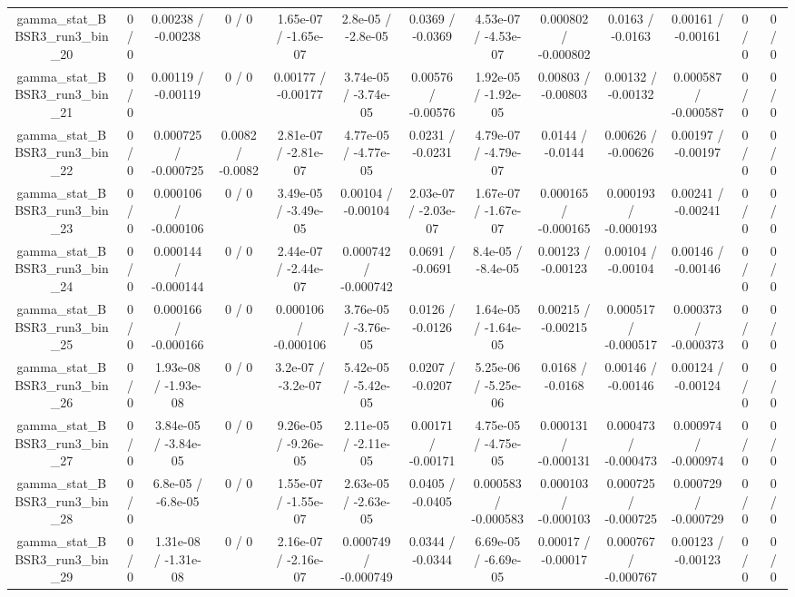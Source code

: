 \documentclass[10pt]{article}
\begin{document}
\begin{table}[htbp]
\begin{center}
\begin{tabular}{|c|c|c|c|c|c|c|c|c|c|c|c|c|}
  gamma_stat_BBSR3_run3_bin_20 & 0 / 0 & 0.00238 / -0.00238 & 0 / 0 & 1.65e-07 / -1.65e-07 & 2.8e-05 / -2.8e-05 & 0.0369 / -0.0369 & 4.53e-07 / -4.53e-07 & 0.000802 / -0.000802 & 0.0163 / -0.0163 & 0.00161 / -0.00161 & 0 / 0 & 0 / 0 \\ 
  gamma_stat_BBSR3_run3_bin_21 & 0 / 0 & 0.00119 / -0.00119 & 0 / 0 & 0.00177 / -0.00177 & 3.74e-05 / -3.74e-05 & 0.00576 / -0.00576 & 1.92e-05 / -1.92e-05 & 0.00803 / -0.00803 & 0.00132 / -0.00132 & 0.000587 / -0.000587 & 0 / 0 & 0 / 0 \\ 
  gamma_stat_BBSR3_run3_bin_22 & 0 / 0 & 0.000725 / -0.000725 & 0.0082 / -0.0082 & 2.81e-07 / -2.81e-07 & 4.77e-05 / -4.77e-05 & 0.0231 / -0.0231 & 4.79e-07 / -4.79e-07 & 0.0144 / -0.0144 & 0.00626 / -0.00626 & 0.00197 / -0.00197 & 0 / 0 & 0 / 0 \\ 
  gamma_stat_BBSR3_run3_bin_23 & 0 / 0 & 0.000106 / -0.000106 & 0 / 0 & 3.49e-05 / -3.49e-05 & 0.00104 / -0.00104 & 2.03e-07 / -2.03e-07 & 1.67e-07 / -1.67e-07 & 0.000165 / -0.000165 & 0.000193 / -0.000193 & 0.00241 / -0.00241 & 0 / 0 & 0 / 0 \\ 
  gamma_stat_BBSR3_run3_bin_24 & 0 / 0 & 0.000144 / -0.000144 & 0 / 0 & 2.44e-07 / -2.44e-07 & 0.000742 / -0.000742 & 0.0691 / -0.0691 & 8.4e-05 / -8.4e-05 & 0.00123 / -0.00123 & 0.00104 / -0.00104 & 0.00146 / -0.00146 & 0 / 0 & 0 / 0 \\ 
  gamma_stat_BBSR3_run3_bin_25 & 0 / 0 & 0.000166 / -0.000166 & 0 / 0 & 0.000106 / -0.000106 & 3.76e-05 / -3.76e-05 & 0.0126 / -0.0126 & 1.64e-05 / -1.64e-05 & 0.00215 / -0.00215 & 0.000517 / -0.000517 & 0.000373 / -0.000373 & 0 / 0 & 0 / 0 \\ 
  gamma_stat_BBSR3_run3_bin_26 & 0 / 0 & 1.93e-08 / -1.93e-08 & 0 / 0 & 3.2e-07 / -3.2e-07 & 5.42e-05 / -5.42e-05 & 0.0207 / -0.0207 & 5.25e-06 / -5.25e-06 & 0.0168 / -0.0168 & 0.00146 / -0.00146 & 0.00124 / -0.00124 & 0 / 0 & 0 / 0 \\ 
  gamma_stat_BBSR3_run3_bin_27 & 0 / 0 & 3.84e-05 / -3.84e-05 & 0 / 0 & 9.26e-05 / -9.26e-05 & 2.11e-05 / -2.11e-05 & 0.00171 / -0.00171 & 4.75e-05 / -4.75e-05 & 0.000131 / -0.000131 & 0.000473 / -0.000473 & 0.000974 / -0.000974 & 0 / 0 & 0 / 0 \\ 
  gamma_stat_BBSR3_run3_bin_28 & 0 / 0 & 6.8e-05 / -6.8e-05 & 0 / 0 & 1.55e-07 / -1.55e-07 & 2.63e-05 / -2.63e-05 & 0.0405 / -0.0405 & 0.000583 / -0.000583 & 0.000103 / -0.000103 & 0.000725 / -0.000725 & 0.000729 / -0.000729 & 0 / 0 & 0 / 0 \\ 
  gamma_stat_BBSR3_run3_bin_29 & 0 / 0 & 1.31e-08 / -1.31e-08 & 0 / 0 & 2.16e-07 / -2.16e-07 & 0.000749 / -0.000749 & 0.0344 / -0.0344 & 6.69e-05 / -6.69e-05 & 0.00017 / -0.00017 & 0.000767 / -0.000767 & 0.00123 / -0.00123 & 0 / 0 & 0 / 0 \\ 

\end{tabular}
\end{center}
\end{table}
\end{document}
